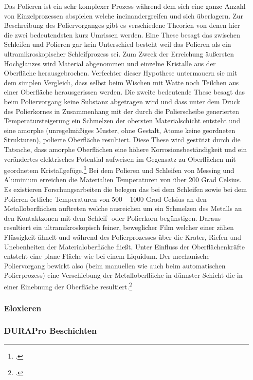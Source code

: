 \documentclass[12pt,a4paper,parskip]{scrartcl}
\begin{document}
Das Polieren ist ein sehr komplexer Prozess während dem sich eine ganze Anzahl von Einzelprozessen abspielen welche ineinandergreifen und sich überlagern. Zur Beschreibung des Poliervorganges gibt es verschiedene Theorien von denen hier die zwei bedeutendsten kurz Umrissen werden. Eine These besagt das zwischen Schleifen und Polieren gar kein Unterschied besteht weil  das Polieren als ein ultramikroskopischer Schleifprozess sei. Zum Zweck der Erreichung  äußersten Hochglanzes wird Material abgenommen und einzelne Kristalle aus der Oberfläche herausgebrochen. Verfechter dieser Hypothese untermauern sie mit dem simplen Vergleich, dass selbst beim Wischen mit Watte noch Teilchen aus einer Oberfläche herausgerissen werden. Die zweite bedeutende These besagt das beim Poliervorgang keine Substanz abgetragen wird und dass unter dem Druck des Polierkornes in Zusammenhang mit der durch die Polierscheibe generierten Temperatursteigerung ein Schmelzen der obersten Materialschicht entsteht und eine amorphe (unregelmäßiges Muster, ohne Gestalt, Atome keine geordneten Strukturen), polierte Oberfläche resultiert. Diese These wird gestützt durch die Tatsache, dass amorphe Oberflächen eine höhere Korrosionsbeständigkeit und ein verändertes elektrisches Potential aufweisen im Gegensatz zu Oberflächen mit geordnetem Kristallgefüge.\footcite[Vgl.][38]{hsp}  Bei dem Polieren und Schleifen von Messing und Aluminium erreichen die Materialien Temperaturen von über 200 Grad Celsius. Es existieren Forschungsarbeiten die belegen das bei dem Schleifen sowie bei dem Polieren örtliche Temperaturen von 500 – 1000 Grad Celsius an den Metalloberflächen auftreten welche ausreichen um ein Schmelzen des Metalls an den Kontaktzonen mit dem Schleif- oder Polierkorn begünstigen. Daraus resultiert ein ultramikroskopisch feiner, beweglicher Film welcher  einer zähen Flüssigkeit ähnelt und während des Polierprozesses über die Krater, Riefen und Unebenheiten der Materialoberfläche fließt. Unter Einfluss der Oberflächenkräfte entsteht eine plane Fläche wie bei einem Liquidum. Der mechanische Poliervorgang bewirkt also (beim manuellen wie auch beim automatischen Polierprozess) eine Verschiebung der Metalloberfläche in dünnster Schicht die in einer Einebnung der Oberfläche resultiert.\footcite[Vgl.][40-41]{hsp}  
\subsubsection{Eloxieren}
\subsubsection{DURAPro  Beschichten}
\end{document}
